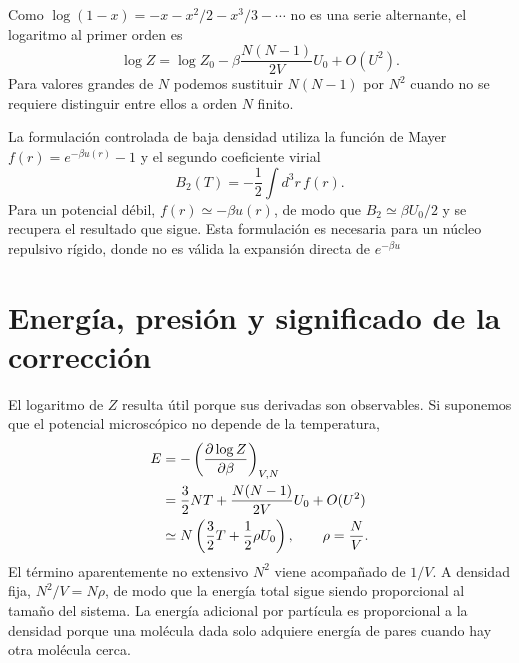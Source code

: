 \begin{classroomqa}\end{classroomqa}

Como \(\log(1-x)=-x-x^2/2-x^3/3-\cdots\) no es una serie alternante, el logaritmo al primer orden es \begin{equation}
 \log Z
 =
 \log Z_0
 -\beta\frac{N(N-1)}{2V}U_0
 +O(U^2).
 \label{eq:sm6-logz-correction}
\end{equation} Para valores grandes de \(N\) podemos sustituir \(N(N-1)\) por \(N^2\) cuando no se requiere distinguir entre ellos a orden \(N\) finito.

\begin{remark}La formulación controlada de baja densidad utiliza la función de Mayer \(f(r)=e^{-\beta u(r)}-1\) y el segundo coeficiente virial \begin{equation}
 B_2(T)=-\frac{1}{2}\int d^3r\,f(r).
 \label{eq:sm6-second-virial}
\end{equation} Para un potencial débil, \(f(r)\simeq-\beta u(r)\), de modo que \(B_2\simeq\beta U_0/2\) y se recupera el resultado que sigue. Esta formulación es necesaria para un núcleo repulsivo rígido, donde no es válida la expansión directa de \(e^{-\beta u}\)\end{remark}

\section{Energía, presión y significado de la corrección}

El logaritmo de \(Z\) resulta útil porque sus derivadas son observables. Si suponemos que el potencial microscópico no depende de la temperatura, \begin{align}
 E
 &=-\left(\frac{\partial\log Z}{\partial\beta}\right)_{V,N} \notag\\
 &=
 \frac{3}{2}NT
 +\frac{N(N-1)}{2V}U_0+O(U^2) \notag\\
 &\simeq
 N\left(\frac{3}{2}T+\frac{1}{2}\rho U_0\right),
 \qquad
 \rho=\frac{N}{V}.
 \label{eq:sm6-energy-correction}
\end{align} El término aparentemente no extensivo \(N^2\) viene acompañado de \(1/V\). A densidad fija, \(N^2/V=N\rho\), de modo que la energía total sigue siendo proporcional al tamaño del sistema. La energía adicional por partícula es proporcional a la densidad porque una molécula dada solo adquiere energía de pares cuando hay otra molécula cerca.

